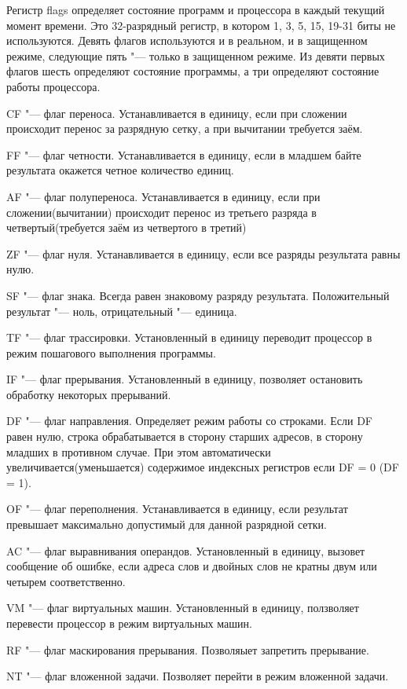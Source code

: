 Регистр flags определяет состояние программ и процессора в каждый текущий момент времени. Это 32-разрядный регистр, 
в котором 1, 3, 5, 15, 19-31 биты не используются. Девять флагов используются и в реальном, и в защищенном режиме,
следующие пять "--- только в защищенном режиме. Из девяти первых флагов шесть определяют состояние программы, а три определяют
состояние работы процессора. 

CF "--- флаг переноса. Устанавливается в единицу, если при сложении происходит перенос за разрядную сетку, а при вычитании
требуется заём. 

FF "--- флаг четности. Устанавливается в единицу, если в младшем байте результата окажется четное количество единиц.

AF "--- флаг полупереноса. Устанавливается в единицу, если при сложении(вычитании) происходит перенос из третьего разряда
в четвертый(требуется заём из четвертого в третий)

ZF "--- флаг нуля. Устанавливается в единицу, если все разряды результата равны нулю.

SF "--- флаг знака. Всегда равен знаковому разряду результата. Положительный результат "--- ноль, отрицательный "--- единица.

TF "--- флаг трассировки. Установленный в единицу переводит процессор в режим пошагового выполнения программы.

IF "--- флаг прерывания. Установленный в единицу, позволяет остановить обработку некоторых прерываний.

DF "--- флаг направления. Определяет режим работы со строками. Если DF равен нулю, строка обрабатывается в сторону старших
адресов, в сторону младших в противном случае. При этом автоматически увеличивается(уменьшается) содержимое индексных регистров
если DF = 0 (DF = 1).

OF "--- флаг переполнения. Устанавливается в единицу, если результат превышает максимально допустимый для данной разрядной
сетки.

AC "--- флаг выравнивания операндов. Установленный в единицу, вызовет сообщение об ошибке, если адреса слов и двойных слов
не кратны двум или четырем соответственно.

VM "--- флаг виртуальных машин. Установленный в единицу, ползволяет перевести процессор в режим виртуальных машин.

RF "--- флаг маскирования прерывания. Позволяыет запретить прерывание.

NT "--- флаг вложенной задачи. Позволяет перейти в режим вложенной задачи.

